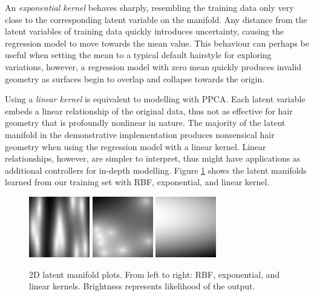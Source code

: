 \documentclass[ %
author={Dillon Keith Diep},
supervisor={Dr. Carl Henrik Ek},
degree={MEng},
title={ART-CG Hair:},
subtitle={Assisted Real-time Content Generation of Stylised Virtual Hair},
type={Research},
year={2017} ]{dissertation}
\begin{document}
An \textit{exponential kernel} behaves sharply, resembling the training data only very close to the corresponding latent variable on the manifold. Any distance from the latent variables of training data quickly introduces uncertainty, causing the regression model to move towards the mean value. This behaviour can perhaps be useful when setting the mean to a typical default hairstyle for exploring variations, however, a regression model with zero mean quickly produces invalid geometry as surfaces begin to overlap and collapse towards the origin.

Using a \textit{linear kernel} is equivalent to modelling with PPCA. Each latent variable embeds a linear relationship of the original data, thus not as effective for hair geometry that is profoundly nonlinear in nature. The majority of the latent manifold in the demonstrative implementation produces nonsensical hair geometry when using the regression model with a linear kernel. Linear relationships, however, are simpler to interpret, thus might have applications as additional controllers for in-depth modelling. Figure \ref{fig:manifold} shows the latent manifolds learned from our training set with RBF, exponential, and linear kernel.

\begin{figure}[!h]
	\centering
	\caption{2D latent manifold plots. From left to right: RBF, exponential, and linear kernels. Brightness represents likelihood of the output.}
	\includegraphics[scale=1]{images/latentPlot_t10}
	\includegraphics[scale=1]{images/latentPlot_exp}
	\includegraphics[scale=1]{images/latentPlot_linear}
	\label{fig:manifold}
\end{figure}
\end{document}
